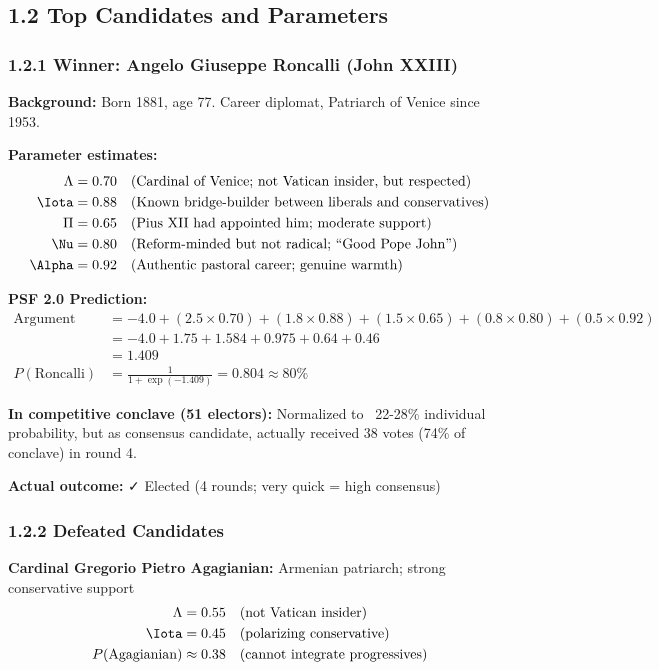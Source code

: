 \subsection{1.2 Top Candidates and Parameters}

\subsubsection{1.2.1 Winner: Angelo Giuseppe Roncalli (John XXIII)}

\textbf{Background:} Born 1881, age 77. Career diplomat, Patriarch of Venice since 1953.

\textbf{Parameter estimates:}
\begin{align*}
\Lambda &= 0.70 \quad \text{(Cardinal of Venice; not Vatican insider, but respected)}\\
\Iota &= 0.88 \quad \text{(Known bridge-builder between liberals and conservatives)}\\
\Pi &= 0.65 \quad \text{(Pius XII had appointed him; moderate support)}\\
\Nu &= 0.80 \quad \text{(Reform-minded but not radical; ``Good Pope John'')}\\
\Alpha &= 0.92 \quad \text{(Authentic pastoral career; genuine warmth)}
\end{align*}

\textbf{PSF 2.0 Prediction:}
\begin{align*}
\text{Argument} &= -4.0 + (2.5 \times 0.70) + (1.8 \times 0.88) + (1.5 \times 0.65) + (0.8 \times 0.80) + (0.5 \times 0.92) \\
&= -4.0 + 1.75 + 1.584 + 0.975 + 0.64 + 0.46 \\
&= 1.409 \\
P(\text{Roncalli}) &= \frac{1}{1 + \exp(-1.409)} = 0.804 \approx 80\%
\end{align*}

\textbf{In competitive conclave (51 electors):} Normalized to ~22-28\% individual probability, but as consensus candidate, actually received 38 votes (74\% of conclave) in round 4.

\textbf{Actual outcome:} ✓ Elected (4 rounds; very quick = high consensus)

\subsubsection{1.2.2 Defeated Candidates}

\textbf{Cardinal Gregorio Pietro Agagianian:} Armenian patriarch; strong conservative support
\begin{align*}
\Lambda &= 0.55 \quad \text{(not Vatican insider)} \\
\Iota &= 0.45 \quad \text{(polarizing conservative)} \\
P(\text{Agagianian}) &\approx 0.38 \quad \text{(cannot integrate progressives)}
\end{align*}

